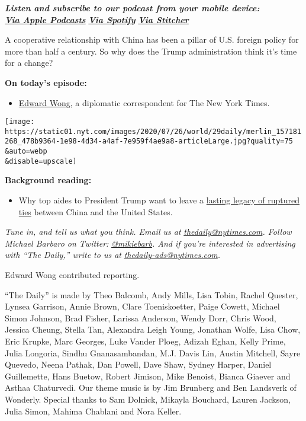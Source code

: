 \emph{\textbf{Listen and subscribe to our podcast from your mobile
device:}}\\
\textbf{\href{https://itunes.apple.com/us/podcast/the-daily/id1200361736?mt=2}{\emph{Via
Apple Podcasts}}} \emph{\textbf{\textbar{}}}
\textbf{\href{https://open.spotify.com/show/3IM0lmZxpFAY7CwMuv9H4g?si=SfuMSC55R1qprFsRZU3_zw}{\emph{Via
Spotify}}} \emph{\textbf{\textbar{}}}
\textbf{\href{http://www.stitcher.com/podcast/the-new-york-times/the-daily-10}{\emph{Via
Stitcher}}}

A cooperative relationship with China has been a pillar of U.S. foreign
policy for more than half a century. So why does the Trump
administration think it's time for a change?

\textbf{On today's episode:}

\begin{itemize}
\tightlist
\item
  \href{https://www.nytimes.com/by/edward-wong}{Edward Wong}, a
  diplomatic correspondent for The New York Times.
\end{itemize}

\texttt{[image: https://static01.nyt.com/images/2020/07/26/world/29daily/merlin\_157181268\_478b9364-1e98-4d34-a4af-7e959f4ae9a8-articleLarge.jpg?quality=75\\\&auto=webp\\\&disable=upscale]}

\textbf{Background reading:}

\begin{itemize}
\tightlist
\item
  Why top aides to President Trump want to leave a
  \href{https://www.nytimes.com/2020/07/25/world/asia/us-china-trump-xi.html}{lasting
  legacy of ruptured ties} between China and the United States.
\end{itemize}

\emph{Tune in, and tell us what you think. Email us at}
\href{mailto:thedaily@nytimes.com}{\emph{thedaily@nytimes.com}}\emph{.
Follow Michael Barbaro on Twitter:}
\href{https://twitter.com/mikiebarb}{\emph{@mikiebarb}}\emph{. And if
you're interested in advertising with ``The Daily,'' write to us at}
\href{mailto:thedaily-ads@nytimes.com}{\emph{thedaily-ads@nytimes.com}}\emph{.}

Edward Wong contributed reporting.

``The Daily'' is made by Theo Balcomb, Andy Mills, Lisa Tobin, Rachel
Quester, Lynsea Garrison, Annie Brown, Clare Toeniskoetter, Paige
Cowett, Michael Simon Johnson, Brad Fisher, Larissa Anderson, Wendy
Dorr, Chris Wood, Jessica Cheung, Stella Tan, Alexandra Leigh Young,
Jonathan Wolfe, Lisa Chow, Eric Krupke, Marc Georges, Luke Vander Ploeg,
Adizah Eghan, Kelly Prime, Julia Longoria, Sindhu Gnanasambandan, M.J.
Davis Lin, Austin Mitchell, Sayre Quevedo, Neena Pathak, Dan Powell,
Dave Shaw, Sydney Harper, Daniel Guillemette, Hans Buetow, Robert
Jimison, Mike Benoist, Bianca Giaever and Asthaa Chaturvedi. Our theme
music is by Jim Brunberg and Ben Landsverk of Wonderly. Special thanks
to Sam Dolnick, Mikayla Bouchard, Lauren Jackson, Julia Simon, Mahima
Chablani and Nora Keller.

